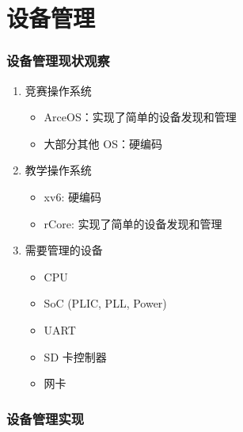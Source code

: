 \section{设备管理}

\begin{frame}
    \frametitle{设备管理现状观察}

    \begin{enumerate}
        \item 竞赛操作系统
              \begin{itemize}
                  \item ArceOS：实现了简单的设备发现和管理
                  \item 大部分其他 OS：硬编码
              \end{itemize}
        \item 教学操作系统
              \begin{itemize}
                  \item xv6: 硬编码
                  \item rCore: 实现了简单的设备发现和管理
              \end{itemize}
        \item 需要管理的设备
              \begin{itemize}
                  \item CPU
                  \item SoC (PLIC, PLL, Power)
                  \item UART
                  \item SD 卡控制器
                  \item 网卡
              \end{itemize}

    \end{enumerate}

\end{frame}

\begin{frame}
    \frametitle{设备管理实现}



\end{frame}

